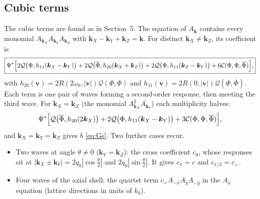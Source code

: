 \documentclass[11pt]{article}
\newcommand{\cQ}{\mathcal{Q}}
\newcommand{\cC}{\mathcal{C}}
\begin{document}
\subsection{Cubic terms}
The cubic terms are found as in Section~5. The equation of
$A_{\boldsymbol k}$ contains every monomial
$A_{\boldsymbol k_X}\overline{A_{\boldsymbol k_Y}}A_{\boldsymbol k_Z}$ with
$\boldsymbol k_X-\boldsymbol k_Y+\boldsymbol k_Z=\boldsymbol k$. For distinct
$\boldsymbol k_X\neq\boldsymbol k_Z$, its coefficient is
\begin{equation}
 \boxed{\Psi^*\Bigl[2\cQ\bigl(\Phi,h_{11}(\boldsymbol k_X-\boldsymbol k_Y)\bigr)
 +2\cQ\bigl(\overline\Phi,h_{20}(\boldsymbol k_X+\boldsymbol k_Z)\bigr)
 +2\cQ\bigl(\Phi,h_{11}(\boldsymbol k_Z-\boldsymbol k_Y)\bigr)
 +6\cC(\Phi,\Phi,\overline\Phi)\Bigr],}
 \label{eq:general-cubic}
\end{equation}
with $h_{20}(\boldsymbol v)=2R(2\omega_0,|\boldsymbol v|)\cQ(\Phi,\Phi)$ and
$h_{11}(\boldsymbol v)=2R(0,|\boldsymbol v|)\cQ(\Phi,\overline\Phi)$. Each
term is one pair of waves forming a second-order response, then meeting the
third wave. For $\boldsymbol k_X=\boldsymbol k_Z$ (the monomial
$A_{\boldsymbol k_X}^2\overline{A_{\boldsymbol k_Y}}$) each multiplicity halves:
\begin{equation}
 \Psi^*\Bigl[\cQ\bigl(\overline\Phi,h_{20}(2\boldsymbol k_X)\bigr)
 +2\cQ\bigl(\Phi,h_{11}(\boldsymbol k_X-\boldsymbol k_Y)\bigr)
 +3\cC(\Phi,\Phi,\overline\Phi)\Bigr],
 \label{eq:general-cubic-repeated}
\end{equation}
and $\boldsymbol k_X=\boldsymbol k_Y=\boldsymbol k_Z$ gives $b$ \eqref{eq:Gs}.
Two further cases recur.
\begin{itemize}
 \item Two waves at angle $\theta\neq0$
 ($\boldsymbol k_Y=\boldsymbol k_Z$): the cross coefficient $c_\theta$, whose
 responses sit at $|\boldsymbol k_X\pm\boldsymbol k_Y|=2q_0|\cos\frac\theta2|$
 and $2q_0|\sin\frac\theta2|$. It gives $c_\pi=c$ and $c_{\pi/2}=c_\perp$.
 \item Four waves of the axial shell: the quartet term
 $c_\times\overline{A_{-\hat x}}A_{\hat y}A_{-\hat y}$ in the
 $A_{\hat x}$ equation (lattice directions in units of $k_0$).
\end{itemize}
\end{document}
